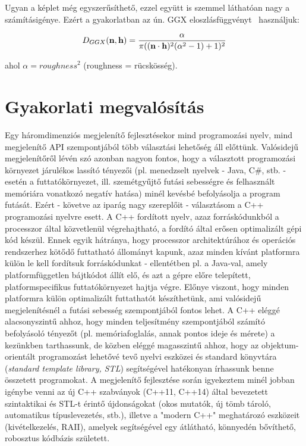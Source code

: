 Ugyan a képlet még egyszerűsíthető, ezzel együtt is szemmel láthatóan nagy a számításigénye. Ezért a gyakorlatban az ún. GGX eloszlásfüggvényt~\cite{walter2007microfacet} használjuk:

\[
D_{GGX}(\mathbf{n}, \mathbf{h}) = { \alpha \over { \pi ((\mathbf{n} \cdot \mathbf{h})^2 (\alpha^2 - 1) + 1)^2 } }
\]

ahol \(\alpha = {roughness}^2\) (roughness = rücskösség).

\section{Gyakorlati megvalósítás}

Egy háromdimenziós megjelenítő fejlesztésekor mind programozási nyelv, mind megjelenítő API szempontjából több választási lehetőség áll előttünk. Valósidejű megjelenítőről lévén szó azonban nagyon fontos, hogy a választott programozási környezet járulékos lassító tényezői (pl. menedzselt nyelvek - Java, C\#, stb. - esetén a futtatókörnyezet, ill. szemétgyűjtő futási sebességre és felhasznált memóriára vonatkozó negatív hatása) minél kevésbé befolyásolja a program futását. Ezért - követve az iparág nagy szereplőit - választásom a C++ programozási nyelvre esett. A C++ fordított nyelv, azaz forráskódunkból a processzor által közvetlenül végrehajtható, a fordító által erősen optimalizált gépi kód készül. Ennek egyik hátránya, hogy processzor architektúrához és operációs rendszerhez kötődő futtatható állományt kapunk, azaz minden kívánt platformra külön le kell fordítsuk forráskódunkat - ellentétben pl. a Java-val, amely platformfüggetlen bájtkódot állít elő, és azt a gépre előre telepített, platformspecifikus futtatókörnyezet hajtja végre. Előnye viszont, hogy minden platformra külön optimalizált futtathatót készíthetünk, ami valósidejű megjelenítésnél a futási sebesség szempontjából fontos lehet. A C++ eléggé alacsonyszintű ahhoz, hogy minden teljesítmény szempontjából számító befolyásoló tényezőt (pl. memóriafoglalás, annak pontos ideje és mérete) a kezünkben tarthassunk, de közben eléggé magasszintű ahhoz, hogy az objektum-orientált programozást lehetővé tevő nyelvi eszközei és standard könyvtára (\textit{standard template library, STL}) segítségével hatékonyan írhassunk benne összetett programokat. A megjelenítő fejlesztése során igyekeztem minél jobban igénybe venni az új C++ szabványok (C++11, C++14) által bevezetett szintaktikai és STL-t érintő újdonságokat (okos mutatók, új tömb tároló, automatikus típuslevezetés, stb.), illetve a "modern C++" meghatározó eszközeit (kivételkezelés, RAII), amelyek segítségével egy átlátható, könnyedén bővíthető, robosztus kódbázis született.

